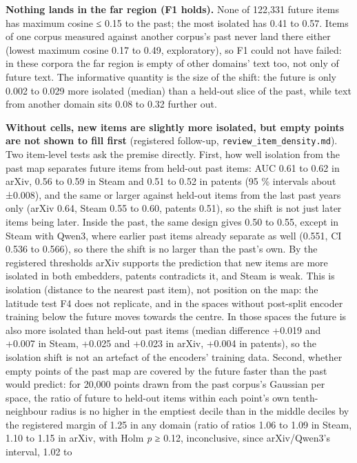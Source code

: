 \documentclass[
  10pt,
]{article}
\begin{document}
\textbf{Nothing lands in the far region
(F1 holds).} None of 122,331 future
items has maximum cosine ≤ 0.15 to the
past; the most isolated has 0.41 to
0.57. Items of one corpus measured
against another corpus's past never land
there either (lowest maximum cosine 0.17
to 0.49, exploratory), so F1 could not
have failed: in these corpora the far
region is empty of other domains' text
too, not only of future text. The
informative quantity is the size of the
shift: the future is only 0.002 to 0.029
more isolated (median) than a held-out
slice of the past, while text from
another domain sits 0.08 to 0.32 further
out.

\textbf{Without cells, new items are
slightly more isolated, but empty points
are not shown to fill first} (registered
follow-up,
\texttt{review\_\allowbreak{}item\_\allowbreak{}density.md}).
Two item-level tests ask the premise
directly. First, how well isolation from
the past map separates future items from
held-out past items: AUC 0.61 to 0.62 in
arXiv, 0.56 to 0.59 in Steam and 0.51 to
0.52 in patents (95 \% intervals about
±0.008), and the same or larger against
held-out items from the last past years
only (arXiv 0.64, Steam 0.55 to 0.60,
patents 0.51), so the shift is not just
later items being later. Inside the
past, the same design gives 0.50 to
0.55, except in Steam with Qwen3, where
earlier past items already separate as
well (0.551, CI 0.536 to 0.566), so
there the shift is no larger than the
past's own. By the registered thresholds
arXiv supports the prediction that new
items are more isolated in both
embedders, patents contradicts it, and
Steam is weak. This is isolation
(distance to the nearest past item), not
position on the map: the latitude test
F4 does not replicate, and in the spaces
without post-split encoder training
below the future moves towards the
centre. In those spaces the future is
also more isolated than held-out past
items (median difference +0.019 and
+0.007 in Steam, +0.025 and +0.023 in
arXiv, +0.004 in patents), so the
isolation shift is not an artefact of
the encoders' training data. Second,
whether empty points of the past map are
covered by the future faster than the
past would predict: for 20,000 points
drawn from the past corpus's Gaussian
per space, the ratio of future to
held-out items within each point's own
tenth-neighbour radius is no higher in
the emptiest decile than in the middle
deciles by the registered margin of 1.25
in any domain (ratio of ratios 1.06 to
1.09 in Steam, 1.10 to 1.15 in arXiv,
with Holm \emph{p} ≥ 0.12, inconclusive,
since arXiv/Qwen3's interval, 1.02 to
\end{document}
